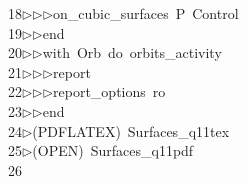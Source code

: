 \begin{tabbing}
18\>$\triangleright$\>$\triangleright$\>$\triangleright$\>on\_cubic\_surfaces\ P\ Control\ \\[0pt]
19\>$\triangleright$\>$\triangleright$\>end\ \\[0pt]
20\>$\triangleright$\>$\triangleright$\>with\ Orb\ do\ orbits\_activity\ \\[0pt]
21\>$\triangleright$\>$\triangleright$\>$\triangleright$\>report\ \\[0pt]
22\>$\triangleright$\>$\triangleright$\>$\triangleright$\>report\_options\ ro\ \\[0pt]
23\>$\triangleright$\>$\triangleright$\>end\\[0pt]
24\>$\triangleright$\>(PDFLATEX)\ Surfaces\_q11tex\ \\[0pt]
25\>$\triangleright$\>(OPEN)\ Surfaces\_q11pdf\\[0pt]
26\>\end{tabbing}
